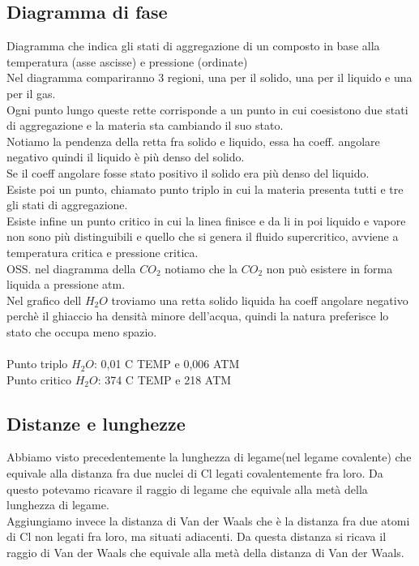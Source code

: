 \subsection{Diagramma di fase}
Diagramma che indica gli stati di aggregazione di un composto in base alla temperatura (asse ascisse) e pressione (ordinate)\\
Nel diagramma compariranno 3 regioni, una per il solido, una per il liquido e una per il gas.\\
Ogni punto lungo queste rette corrisponde a un punto in cui coesistono due stati di aggregazione e la materia sta cambiando il suo stato.\\
Notiamo la pendenza della retta fra solido e liquido, essa ha coeff. angolare negativo quindi il liquido è più denso del solido.\\
Se il coeff angolare fosse stato positivo il solido era più denso del liquido. \\
Esiste poi un punto, chiamato punto triplo in cui la materia presenta tutti e tre gli stati di aggregazione. \\
Esiste infine un punto critico in cui la linea finisce e da li in poi liquido e vapore non sono più distinguibili e quello che si genera il fluido supercritico, avviene a temperatura critica e pressione critica.  \\
OSS. nel diagramma della $CO_2$ notiamo che la $CO_2$ non può esistere in forma liquida a pressione atm.\\
Nel grafico dell $H_2O$ troviamo una retta solido liquida ha coeff angolare negativo perchè il ghiaccio ha densità minore dell’acqua, quindi la natura preferisce lo stato che occupa meno spazio.\\\\
Punto triplo $H_2O$: 0,01 C TEMP e 0,006 ATM\\
Punto critico $H_2O$: 374 C TEMP e 218 ATM
\subsection{Distanze e lunghezze}
Abbiamo visto precedentemente la lunghezza di legame(nel legame covalente) che equivale alla distanza fra due nuclei di Cl legati covalentemente fra loro. Da questo potevamo ricavare il raggio di legame che equivale alla metà della lunghezza di legame.\\
Aggiungiamo invece la distanza di Van der Waals che è la distanza fra due atomi di Cl non legati fra loro, ma situati adiacenti. Da questa distanza si ricava il raggio di Van der Waals che equivale alla metà della distanza di Van der Waals.
